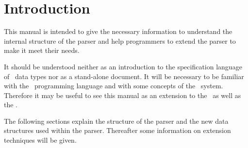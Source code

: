\section{Introduction}

This manual is intended to give the necessary information to understand
the internal structure of the parser and help programmers to extend
the parser to make it meet their needs.

It should be understood neither as an introduction to the specification
language of \redux\ data types nor as a stand-alone document. It will be
necessary to be familiar with the \ALDES\ programming language and with
some concepts of the \redux\ system. Therefore it may be useful
to see this manual as an extension to the \NPUG\ as well as
the \RUD.

The following sections explain the structure of the parser and the
new data structures used within the parser. Thereafter some information
on extension techniques will be given.
